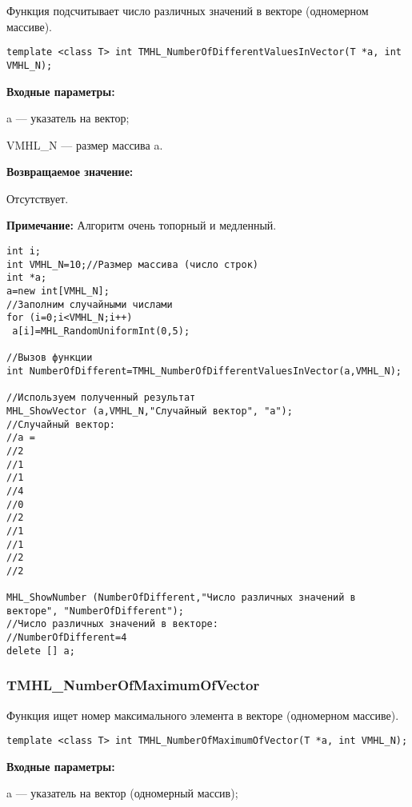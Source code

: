 \documentclass[a4paper,12pt]{article}
\begin{document}
Функция подсчитывает число различных значений в векторе (одномерном массиве).


\begin{lstlisting}[label=code_syntax_TMHL_NumberOfDifferentValuesInVector,caption=Синтаксис]
template <class T> int TMHL_NumberOfDifferentValuesInVector(T *a, int VMHL_N);
\end{lstlisting}

\textbf{Входные параметры:}  
 
a --- указатель на вектор;
 
VMHL\_N --- размер массива a.

\textbf{Возвращаемое значение:}

Отсутствует.

\textbf{Примечание:}
 Алгоритм очень топорный и медленный.


\begin{lstlisting}[label=code_use_TMHL_NumberOfDifferentValuesInVector,caption=Пример использования]
int i;
int VMHL_N=10;//Размер массива (число строк)
int *a;
a=new int[VMHL_N];
//Заполним случайными числами
for (i=0;i<VMHL_N;i++)
 a[i]=MHL_RandomUniformInt(0,5);

//Вызов функции
int NumberOfDifferent=TMHL_NumberOfDifferentValuesInVector(a,VMHL_N);

//Используем полученный результат
MHL_ShowVector (a,VMHL_N,"Случайный вектор", "a");
//Случайный вектор:
//a =
//2
//1
//1
//4
//0
//2
//1
//1
//2
//2

MHL_ShowNumber (NumberOfDifferent,"Число различных значений в векторе", "NumberOfDifferent");
//Число различных значений в векторе:
//NumberOfDifferent=4
delete [] a;
\end{lstlisting}

\subsubsection{TMHL\_NumberOfMaximumOfVector}\label{TMHL_NumberOfMaximumOfVector}

Функция ищет номер максимального элемента в векторе (одномерном массиве).


\begin{lstlisting}[label=code_syntax_TMHL_NumberOfMaximumOfVector,caption=Синтаксис]
template <class T> int TMHL_NumberOfMaximumOfVector(T *a, int VMHL_N);
\end{lstlisting}

\textbf{Входные параметры:}

 a --- указатель на вектор (одномерный массив);
 
\end{document}

